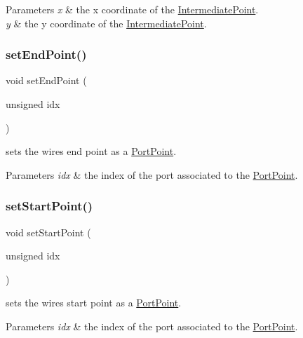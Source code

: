 \begin{DoxyParams}{Parameters}
{\em x} & the x coordinate of the \mbox{\hyperlink{class_open_chams_1_1_intermediate_point}{Intermediate\+Point}}. \\
\hline
{\em y} & the y coordinate of the \mbox{\hyperlink{class_open_chams_1_1_intermediate_point}{Intermediate\+Point}}. \\
\hline
\end{DoxyParams}
\mbox{\label{class_open_chams_1_1_wire_a25430c9acf02567164074625ba56e5ef}} 
\subsubsection{\texorpdfstring{set\+End\+Point()}{setEndPoint()}}
{\footnotesize\ttfamily void set\+End\+Point (\begin{DoxyParamCaption}\item[{unsigned}]{idx }\end{DoxyParamCaption})}



sets the wire\textquotesingle{}s end point as a \mbox{\hyperlink{class_open_chams_1_1_port_point}{Port\+Point}}. 


\begin{DoxyParams}{Parameters}
{\em idx} & the index of the port associated to the \mbox{\hyperlink{class_open_chams_1_1_port_point}{Port\+Point}}. \\
\hline
\end{DoxyParams}
\mbox{\label{class_open_chams_1_1_wire_a37335a2ff923eb45ff5d4f2f4e41b8b1}} 
\subsubsection{\texorpdfstring{set\+Start\+Point()}{setStartPoint()}}
{\footnotesize\ttfamily void set\+Start\+Point (\begin{DoxyParamCaption}\item[{unsigned}]{idx }\end{DoxyParamCaption})}



sets the wire\textquotesingle{}s start point as a \mbox{\hyperlink{class_open_chams_1_1_port_point}{Port\+Point}}. 


\begin{DoxyParams}{Parameters}
{\em idx} & the index of the port associated to the \mbox{\hyperlink{class_open_chams_1_1_port_point}{Port\+Point}}. \\
\hline
\end{DoxyParams}
